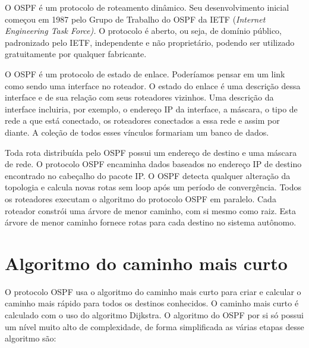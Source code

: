 \documentclass[12pt,a4paper]{report}
\begin{document}
O OSPF \'e um protocolo de roteamento din\^amico. Seu desenvolvimento inicial come\c{c}ou em 1987 pelo Grupo de Trabalho do OSPF da IETF (\textit{Internet Engineering Task Force).} O protocolo \'e aberto, ou seja, de dom\'inio p\'ublico, padronizado pelo IETF, independente e n\~ao propriet\'ario, podendo ser utilizado gratuitamente por qualquer fabricante. 

O OSPF \'e um protocolo de estado de enlace. Poder\'iamos pensar em um link como sendo uma interface no roteador. O estado do enlace \'e uma descri\c{c}\~ao dessa interface e de sua rela\c{c}\~ao com seus roteadores vizinhos. Uma descri\c{c}\~ao da interface incluiria, por exemplo, o endere\c{c}o IP da interface, a m\'ascara, o tipo de rede a que est\'a conectado, os roteadores conectados a essa rede e assim por diante.\cite{Kurose:2012:CNT:2584507} A cole\c{c}\~ao de todos esses v\'inculos formariam um banco de dados.

Toda rota distribu\'ida pelo OSPF possui um endere\c{c}o de destino e uma m\'ascara de rede. O protocolo OSPF encaminha dados baseados no endere\c{c}o IP de destino encontrado no cabe\c{c}alho do pacote IP. O OSPF detecta qualquer altera\c{c}\~ao da topologia e calcula novas rotas sem loop ap\'os um per\'iodo de converg\^encia. Todos os roteadores executam o algoritmo do protocolo OSPF em paralelo. Cada roteador constr\'oi uma \'arvore de menor caminho, com si mesmo como raiz. Esta \'arvore de menor caminho fornece rotas para cada destino no sistema aut\^onomo.\cite{Kurose:2012:CNT:2584507}


\section{Algoritmo do caminho mais curto}

O protocolo OSPF usa o algoritmo do caminho mais curto para criar e calcular o caminho mais r\'apido para todos os destinos conhecidos. O caminho mais curto \'e calculado com o uso do algoritmo Dijkstra. O algoritmo do OSPF por si s\'o possui um n\'ivel muito alto de complexidade, de forma simplificada as v\'arias etapas desse algoritmo s\~ao:
\end{document}
